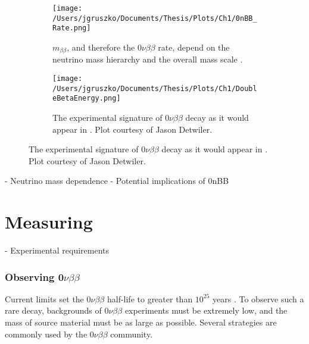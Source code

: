  \begin{figure}[h]
 \centering
    \begin{subfigure}[b]{.40\textwidth}
      \texttt{[image: /Users/jgruszko/Documents/Thesis/Plots/Ch1/0nBB\_Rate.png]}
       \caption{$m_{\beta\beta}$, and therefore the $0\nu\beta\beta$ rate, depend on the neutrino mass hierarchy and the overall mass scale \cite{ZuberINT2015} .}
        \label{0nBBrate}
        \end{subfigure}   
         \hfil
        \begin{subfigure}[b]{0.4\textwidth}
      \texttt{[image: /Users/jgruszko/Documents/Thesis/Plots/Ch1/DoubleBetaEnergy.png]} 
      \caption{The experimental signature of $0\nu\beta\beta$ decay as it would appear in . Plot courtesy of Jason Detwiler.}
      \label{0nBBspectrum}
    \end{subfigure}   
\end{figure}
 

	- Neutrino mass dependence
- Potential implications of 0nBB
\section{Measuring \nonubb}
- Experimental requirements
\subsubsection{Observing 0$\nu\beta\beta$}
Current limits set the $0\nu\beta\beta$ half-life to greater than $10^{25}$ years \cite{EXO2014}. To observe such a rare decay, backgrounds of $0\nu\beta\beta$ experiments must be extremely low, and the mass of source material must be as large as possible. Several strategies are commonly used by the $0\nu\beta\beta$ community. 

